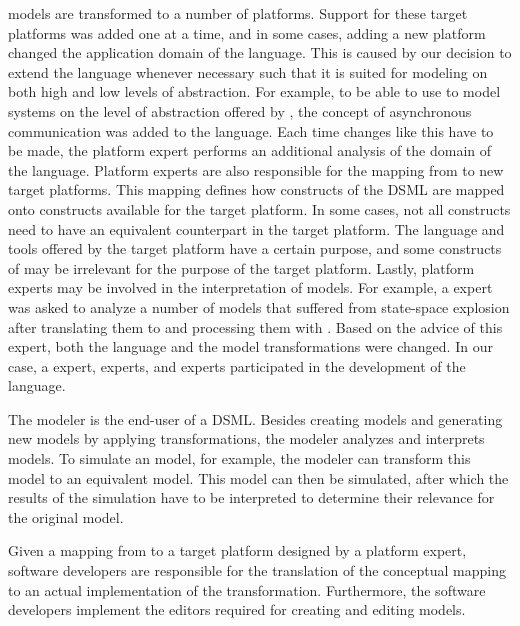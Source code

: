 \SLCO models are transformed to a number of platforms.
Support for these target platforms was added one at a time, and in some cases, adding a new platform changed the application domain of the language.
This is caused by our decision to extend the language whenever necessary such that it is suited for modeling on both high and low levels of abstraction.
For example, to be able to use \SLCO to model systems on the level of abstraction offered by \NQC, the concept of asynchronous communication was added to the language.
Each time changes like this have to be made, the platform expert performs an additional analysis of the domain of the language.
Platform experts are also responsible for the mapping from \SLCO to new target platforms.
This mapping defines how constructs of the DSML are mapped onto constructs available for the target platform.
In some cases, not all constructs need to have an equivalent counterpart in the target platform.
The language and tools offered by the target platform have a certain purpose, and some constructs of \SLCO may be irrelevant for the purpose of the target platform.
Lastly, platform experts may be involved in the interpretation of models.
For example, a \Spin expert was asked to analyze a number of \SLCO models that suffered from state-space explosion after translating them to \Promela and processing them with \Spin.
Based on the advice of this expert, both the language and the model transformations were changed.
In our case, a \POOSL expert, \Spin experts, and \NQC experts participated in the development of the language.

The modeler is the end-user of a DSML.
Besides creating models and generating new models by applying transformations, the modeler analyzes and interprets models.
To simulate an \SLCO model, for example, the modeler can transform this model to an equivalent \POOSL model.
This \POOSL model can then be simulated, after which the results of the simulation have to be interpreted to determine their relevance for the original \SLCO model.

Given a mapping from \SLCO to a target platform designed by a platform expert, software developers are responsible for the translation of the conceptual mapping to an actual implementation of the transformation.
Furthermore, the software developers implement the editors required for creating and editing models.

